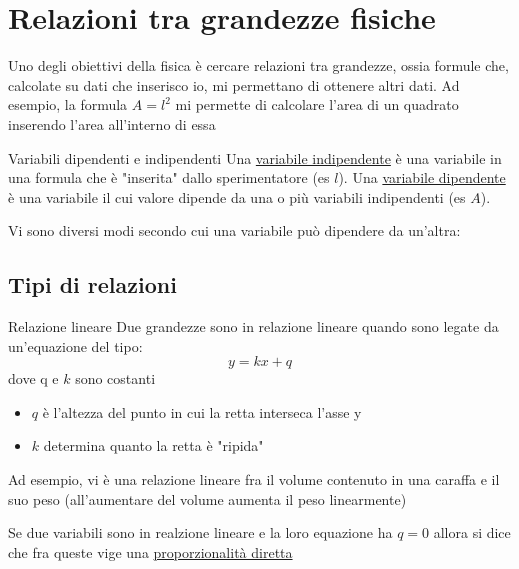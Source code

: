 \section{Relazioni tra grandezze fisiche}
Uno degli obiettivi della fisica è cercare relazioni tra grandezze, ossia formule che, calcolate su dati che inserisco io, mi permettano di ottenere altri dati. Ad esempio, la formula $ A = l^2  $  mi permette di calcolare l'area di un quadrato inserendo l'area all'interno di essa
\begin{definizione}{Variabili dipendenti e indipendenti}
	Una \underline{variabile indipendente} è una variabile in una formula che è "inserita" dallo sperimentatore (es $ l $).
	\vskip3mm
	Una \underline{variabile dipendente} è una variabile il cui valore dipende da una o più variabili indipendenti (es $ A $).
\end{definizione}
Vi sono diversi modi secondo cui una variabile può  dipendere da un'altra:
\subsection{Tipi di relazioni}
\begin{definizione}{Relazione lineare}
	Due grandezze sono in relazione lineare quando sono legate da un'equazione del tipo:
	\[
		y = kx + q
	\]
	dove q e $ k $ sono costanti
	\vskip3mm
	\begin{minipage}[c]{0.48\textwidth}
	\end{minipage}
	\begin{minipage}[c]{0.48\textwidth}
		\begin{itemize}
			\item $ q $ è l'altezza del punto in cui la retta interseca l'asse y
			\item $ k $ determina quanto la retta è "ripida"
		\end{itemize}
	\end{minipage}
\end{definizione}
Ad esempio, vi è una relazione lineare fra il volume contenuto in una caraffa e il suo peso (all'aumentare del volume aumenta il peso linearmente)
\begin{tcolorbox}
	Se due variabili sono in realzione lineare e la loro equazione ha $ q=0 $ allora si dice che fra queste vige una \underline{proporzionalità diretta}
\end{tcolorbox}

